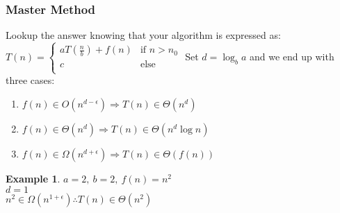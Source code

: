 \documentclass[]{article}
\theoremstyle{definition}
\newtheorem{ex}{Example}[section]
\begin{document}
			\subsubsection{Master Method}
				Lookup the answer knowing that your algorithm is expressed as: 
				$T(n) =
				\begin{cases}
					aT(\frac{n}{b}) + f(n) & \mbox{if } n > n_0 \\
					c & \mbox{else} \\
				\end{cases} 
				$
				Set $d = \log_{b}a$ and we end up with three cases:
				\begin{enumerate}
					\item $f(n) \in O(n^{d-\epsilon}) \Rightarrow T(n) \in \Theta(n^d)$
					\item $f(n) \in \Theta(n^{d}) \Rightarrow T(n) \in \Theta(n^{d}\log n)$
					\item $f(n) \in \Omega(n^{d+\epsilon}) \Rightarrow T(n) \in \Theta(f(n))$
				\end{enumerate}
				\begin{ex}
					$a=2,\ b=2,\ f(n) = n^2$ \\
					$d = 1$ \\
					$n^2 \in \Omega(n^{1 + \epsilon}) \therefore T(n) \in \Theta(n^2)$ 
				\end{ex}
							
\end{document}
